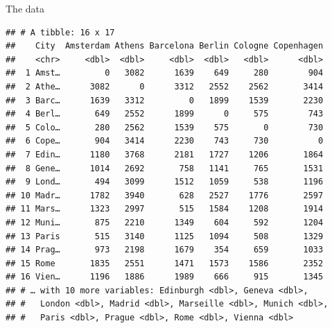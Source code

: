 \documentclass[ignorenonframetext,]{beamer}
\begin{document}
\begin{frame}[fragile]{The data}
\protect\hypertarget{the-data}{}

\scriptsize

\begin{verbatim}
## # A tibble: 16 x 17
##    City  Amsterdam Athens Barcelona Berlin Cologne Copenhagen
##    <chr>     <dbl>  <dbl>     <dbl>  <dbl>   <dbl>      <dbl>
##  1 Amst…         0   3082      1639    649     280        904
##  2 Athe…      3082      0      3312   2552    2562       3414
##  3 Barc…      1639   3312         0   1899    1539       2230
##  4 Berl…       649   2552      1899      0     575        743
##  5 Colo…       280   2562      1539    575       0        730
##  6 Cope…       904   3414      2230    743     730          0
##  7 Edin…      1180   3768      2181   1727    1206       1864
##  8 Gene…      1014   2692       758   1141     765       1531
##  9 Lond…       494   3099      1512   1059     538       1196
## 10 Madr…      1782   3940       628   2527    1776       2597
## 11 Mars…      1323   2997       515   1584    1208       1914
## 12 Muni…       875   2210      1349    604     592       1204
## 13 Paris       515   3140      1125   1094     508       1329
## 14 Prag…       973   2198      1679    354     659       1033
## 15 Rome       1835   2551      1471   1573    1586       2352
## 16 Vien…      1196   1886      1989    666     915       1345
## # … with 10 more variables: Edinburgh <dbl>, Geneva <dbl>,
## #   London <dbl>, Madrid <dbl>, Marseille <dbl>, Munich <dbl>,
## #   Paris <dbl>, Prague <dbl>, Rome <dbl>, Vienna <dbl>
\end{verbatim}

\normalsize

\end{frame}
\end{document}
